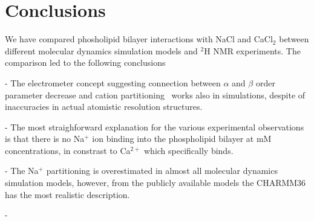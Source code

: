 \documentclass[pre,aps,floatfix,authordate1-4,twocolumn]{revtex4-1}
\begin{document}
\section{Conclusions}
We have compared phosholipid bilayer interactions with NaCl and CaCl$_2$ between different molecular dynamics simulation
models and $^2$H NMR experiments. The comparison led to the following conclusions

- The electrometer concept suggesting connection between $\alpha$ and $\beta$ order parameter decrease and
cation partitioning~\cite{akutsu81,altenbach84,seelig87,scherer89} works also in simulations, despite of inaccuracies in actual atomistic resolution structures. 

- The most straighforward explanation for the various experimental observations is that there is no Na$^+$ ion binding
into the phospholipid bilayer at mM concentrations, in constrast to Ca$^{2+}$ which specifically binds.

- The Na$^+$ partitioning is overestimated in almost all molecular dynamics simulation models, however, from the publicly available models the CHARMM36 has the most realistic description.


-  




\end{document}

